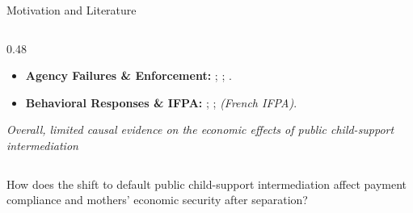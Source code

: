 \documentclass[aspectratio=169,10pt]{beamer}
\begin{document}
\begin{frame}{Motivation and Literature}
\begin{columns}[T,onlytextwidth]
\begin{column}{0.48\textwidth}
\begin{itemize}
    \item \textbf{Agency Failures \& Enforcement:}
    \textcite{weiss1993transfers};
    \textcite{chiappori2007divorce};
    \textcite{freeman2001dunning}.

    \item \textbf{Behavioral Responses \& IFPA:}
    \textcite{rossin2018parental};
    \textcite{cancian2013discouraging};
    \textcite{titlied2024} \textit{(French IFPA)}.

  \end{itemize}

  \vspace{0.12cm}

  \textit{Overall, limited causal evidence on the economic
  effects of public child-support intermediation}

\end{column}

\end{columns}

\vspace{0.35cm}
\begin{keybox}
  \footnotesize
  How does the shift to default public
        child-support intermediation affect
        payment compliance and mothers'
        economic security after separation?
\end{keybox}
\end{frame}
\end{document}
